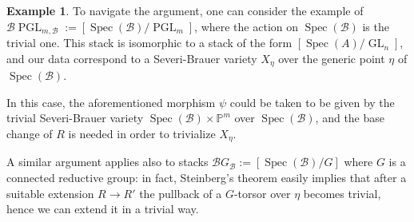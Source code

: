 \documentclass{amsart}
\newcommand{\bP}{\mathbb{P}}
\newcommand{\cB}{\mathcal{B}}
\newcommand{\qB}{R}
\newcommand{\qR}{\cB}
\newcommand{\spec}{\operatorname{Spec}}
\newcommand{\GL}{\operatorname{GL}}
\newcommand{\PGL}{\operatorname{PGL}}
\theoremstyle{definition}
\newtheorem{EG}[theorem]{Example}
\begin{document}
\begin{EG} 
To navigate the argument, one can consider the example of $\cB\PGL_{m,\qR}:=[\spec(\qR)/\PGL_m]$, where the action on $\spec(\qR)$ is the trivial one. This stack is isomorphic to a stack of the form $[\spec(A)/\GL_n]$, and our data correspond to a Severi-Brauer variety $X_\eta$ over the generic point $\eta$ of $\spec(\qR)$. 

In this case, the aforementioned morphism $\psi$ could be taken to be given by the trivial Severi-Brauer variety $\spec(\qR)\times\bP^m$ over $\spec(\qR)$, and the base change of $\qB$ is needed in order to trivialize $X_\eta$. 

A similar argument applies also to stacks $\cB G_{\qR}:=[\spec(\qR)/G]$ where $G$ is a connected reductive group: in fact, Steinberg's theorem easily implies that after a suitable extension $\qB\to \qB'$ the pullback of a $G$-torsor over $\eta$ becomes trivial, hence we can extend it in a trivial way.
\end{EG}
\end{document}
